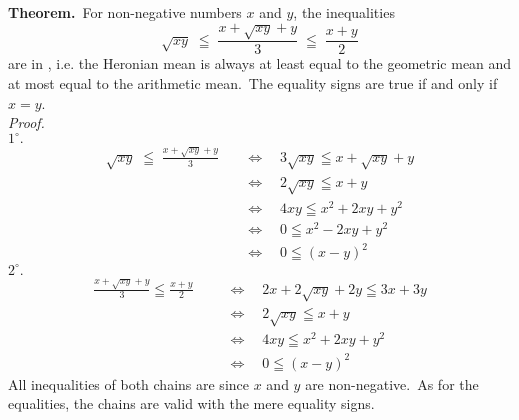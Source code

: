 \documentclass[12pt]{article}
\theoremstyle{definition}
\begin{document}

\textbf{Theorem.}\, For non-negative numbers $x$ and $y$, the inequalities
$$\sqrt{xy} \;\leqq\; \frac{x\!+\!\sqrt{xy}\!+\!y}{3} \;\leqq\; \frac{x\!+\!y}{2}$$
are in , i.e. the Heronian mean is always at least equal to the geometric mean and at most equal to the arithmetic mean.\, The equality signs are true if and only if \,$x = y$.\\

{\em Proof.}\\
$1^\circ.$\; \begin{align*}
\sqrt{xy}\;\leqq\;\frac{x\!+\!\sqrt{xy}\!+\!y}{3}&\quad\Leftrightarrow\quad 3\sqrt{xy} \leqq x\!+\!\sqrt{xy}\!+\!y\\ 
& \quad \Leftrightarrow \quad 2\sqrt{xy} \leqq x\!+\!y\\ 
& \quad \Leftrightarrow \quad 4xy \leqq x^2\!+\!2xy\!+\!y^2\\
& \quad \Leftrightarrow \quad 0 \leqq x^2\!-\!2xy\!+\!y^2\\
& \quad \Leftrightarrow \quad 0 \leqq (x\!-\!y)^2
\end{align*}
$2^\circ.$\; \begin{align*}
\frac{x\!+\!\sqrt{xy}\!+\!y}{3} \leqq \frac{x\!+\!y}{2}\;\;& \quad\Leftrightarrow\quad 2x\!+\!2\sqrt{xy}\!+\!2y \leqq 3x\!+\!3y\\ 
& \quad \Leftrightarrow \quad 2\sqrt{xy} \leqq x\!+\!y\\
& \quad \Leftrightarrow \quad  4xy \leqq x^2\!+\!2xy\!+\!y^2\\
& \quad \Leftrightarrow \quad 0 \leqq (x\!-\!y)^2
\end{align*}
All  inequalities of both chains are  since $x$ and $y$ are non-negative.\, As for the equalities, the chains are valid with the mere equality signs.
\end{document}
